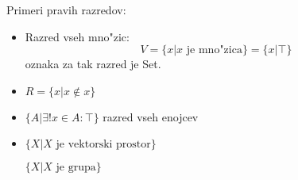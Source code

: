 Primeri pravih razredov:
\begin{itemize}
	\item Razred vseh mno"zic:
	\begin{equation*}
	V = \{x | \text{$x$ je mno"zica}\} = \{x | \top\}
	\end{equation*}
	oznaka za tak razred je Set.
	
	\item $R = \{x | x \notin x\}$
	
	\item  $\{A | \exists!x \in A:\top\}$ razred vseh enojcev
	
	\item $\{X | \text{$X$ je vektorski prostor}\}$
	
	$\{X | \text{$X$ je grupa}\}$
\end{itemize}
